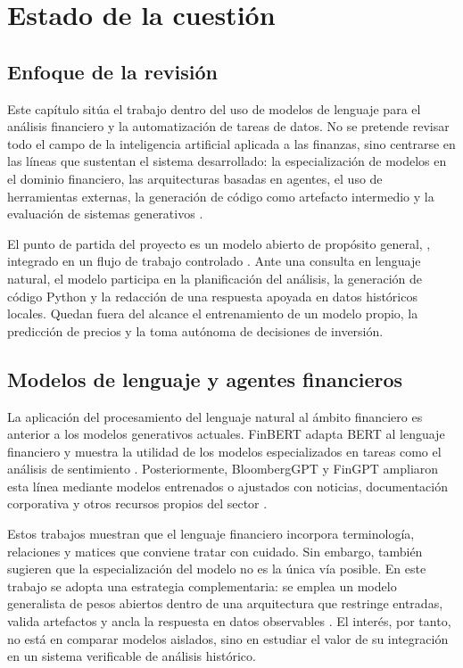 \chapter{Estado de la cuesti\'on}

\section{Enfoque de la revisi\'on}

Este cap\'itulo sit\'ua el trabajo dentro del uso de modelos de lenguaje para el an\'alisis financiero y la automatizaci\'on de tareas de datos. No se pretende revisar 
todo el campo de la inteligencia artificial aplicada a las finanzas, sino centrarse en las l\'ineas que sustentan el sistema desarrollado: la especializaci\'on de 
modelos en el dominio financiero, las arquitecturas basadas en agentes, el uso de herramientas externas, la generaci\'on de c\'odigo como artefacto intermedio y la 
evaluaci\'on de sistemas generativos \cite{wang2023agentsurvey,peng2024usefuleval}.

El punto de partida del proyecto es un modelo abierto de prop\'osito general, , integrado en un flujo de trabajo controlado 
\cite{openai2025gptossmodelcard}. Ante una consulta en lenguaje natural, el modelo participa en la planificaci\'on del an\'alisis, la generaci\'on de c\'odigo Python y 
la redacci\'on de una respuesta apoyada en datos hist\'oricos locales. Quedan fuera del alcance el entrenamiento de un modelo propio, la predicci\'on de precios y la 
toma aut\'onoma de decisiones de inversi\'on.

\section{Modelos de lenguaje y agentes financieros}

La aplicaci\'on del procesamiento del lenguaje natural al \'ambito financiero es anterior a los modelos generativos actuales. FinBERT adapta BERT al lenguaje financiero 
y muestra la utilidad de los modelos especializados en tareas como el an\'alisis de sentimiento \cite{araci2019finbert}. Posteriormente, BloombergGPT y FinGPT ampliaron 
esta l\'inea mediante modelos entrenados o ajustados con noticias, documentaci\'on corporativa y otros recursos propios del sector \cite{wu2023bloomberggpt,yang2023fingpt}.

Estos trabajos muestran que el lenguaje financiero incorpora terminolog\'ia, relaciones y matices que conviene tratar con cuidado. Sin embargo, tambi\'en sugieren que la 
especializaci\'on del modelo no es la \'unica v\'ia posible. En este trabajo se adopta una estrategia complementaria: se emplea un modelo generalista de pesos abiertos 
dentro de una arquitectura que restringe entradas, valida artefactos y ancla la respuesta en datos observables \cite{openai2025gptossmodelcard}. El inter\'es, por tanto, 
no est\'a en comparar modelos aislados, sino en estudiar el valor de su integraci\'on en un sistema verificable de an\'alisis hist\'orico.

